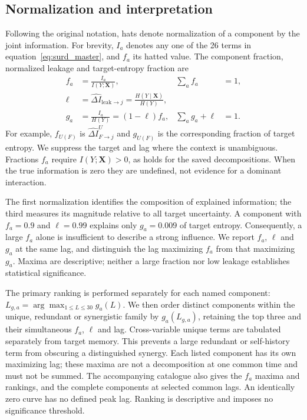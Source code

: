 \documentclass[fleqn,usenatbib]{mnras}
\begin{document}
\subsection{Normalization and interpretation}
\label{sec:normalization}
Following the original notation, hats denote normalization of a component by the joint information. For brevity, $I_a$ denotes any one of the 26 terms in equation~\eqref{eq:surd_master}, and $f_a$ its hatted value. The component fraction, normalized leakage and target-entropy fraction are
\begin{equation}
\begin{aligned}
f_a&=\frac{I_a}{I(Y;\mathbf{X})}, &\sum_a f_a&=1,\\
\ell&=\widehat{\Delta I}_{\mathrm{leak}\to j}
=\frac{H(Y\mid\mathbf{X})}{H(Y)},\\
g_a&=\frac{I_a}{H(Y)}=(1-\ell)f_a,
&\sum_a g_a+\ell&=1.
\end{aligned}
\label{eq:normalizations}
\end{equation}
For example, $f_{U(F)}$ is $\widehat{\Delta I}^{U}_{F\to j}$ and $g_{U(F)}$ is the corresponding fraction of target entropy. We suppress the target and lag where the context is unambiguous. Fractions $f_a$ require $I(Y;\mathbf{X})>0$, as holds for the saved decompositions. When the true information is zero they are undefined, not evidence for a dominant interaction.

The first normalization identifies the composition of explained information; the third measures its magnitude relative to all target uncertainty. A component with $f_a=0.9$ and $\ell=0.99$ explains only $g_a=0.009$ of target entropy. Consequently, a large $f_a$ alone is insufficient to describe a strong influence. We report $f_a$, $\ell$ and $g_a$ at the same lag, and distinguish the lag maximizing $f_a$ from that maximizing $g_a$. Maxima are descriptive; neither a large fraction nor low leakage establishes statistical significance.

The primary ranking is performed separately for each named component: $L_{g,a}=\arg\max_{1\leq L\leq30}g_a(L)$. We then order distinct components within the unique, redundant or synergistic family by $g_a(L_{g,a})$, retaining the top three and their simultaneous $f_a$, $\ell$ and lag. Cross-variable unique terms are tabulated separately from target memory. This prevents a large redundant or self-history term from obscuring a distinguished synergy. Each listed component has its own maximizing lag; these maxima are not a decomposition at one common time and must not be summed. The accompanying catalogue also gives the $f_a$ maxima and rankings, and the complete components at selected common lags. An identically zero curve has no defined peak lag. Ranking is descriptive and imposes no significance threshold.
\end{document}
